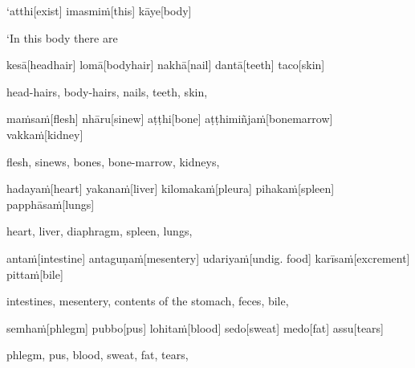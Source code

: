 \begin{samepage}
\begingl[glneveryline={\PaliGlossA,\PaliGlossB}]
‘atthi[exist] imasmiṁ[this] kāye[body]
\endgl
\nopagebreak
\linespread{0.5}
\begin{spacin}{0.2}
{\PaliGlossFT ‘In this body there are}
\end{spacin}
\vskip 12pt
\end{samepage}
\begin{samepage}
\begingl[glneveryline={\PaliGlossA,\PaliGlossB}]
kesā[headhair] lomā[bodyhair] nakhā[nail] dantā[teeth] taco[skin]
\endgl
\nopagebreak
\linespread{0.5}
\begin{spacin}{0.2}
{\PaliGlossFT head-hairs, body-hairs, nails, teeth, skin,}
\end{spacin}
\vskip 12pt
\end{samepage}
\begin{samepage}
\begingl[glneveryline={\PaliGlossA,\PaliGlossB}]
maṁsaṁ[flesh] nhāru[sinew] aṭṭhi[bone] aṭṭhimiñjaṁ[bonemarrow] vakkaṁ[kidney]
\endgl
\nopagebreak
\linespread{0.5}
\begin{spacin}{0.2}
{\PaliGlossFT flesh, sinews, bones, bone-marrow, kidneys,}
\end{spacin}
\vskip 12pt
\end{samepage}
\begin{samepage}
\begingl[glneveryline={\PaliGlossA,\PaliGlossB}]
hadayaṁ[heart] yakanaṁ[liver] kilomakaṁ[pleura] pihakaṁ[spleen] papphāsaṁ[lungs]
\endgl
\nopagebreak
\linespread{0.5}
\begin{spacin}{0.2}
{\PaliGlossFT heart, liver, diaphragm, spleen, lungs,}
\end{spacin}
\vskip 12pt
\end{samepage}
\begin{samepage}
\begingl[glneveryline={\PaliGlossA,\PaliGlossB}]
antaṁ[intestine] antaguṇaṁ[mesentery] udariyaṁ[undig. food] karīsaṁ[excrement] pittaṁ[bile]
\endgl
\nopagebreak
\linespread{0.5}
\begin{spacin}{0.2}
{\PaliGlossFT intestines, mesentery, contents of the stomach, feces, bile,}
\end{spacin}
\vskip 12pt
\end{samepage}
\begin{samepage}
\begingl[glneveryline={\PaliGlossA,\PaliGlossB}]
semhaṁ[phlegm] pubbo[pus] lohitaṁ[blood] sedo[sweat] medo[fat] assu[tears]
\endgl
\nopagebreak
\linespread{0.5}
\begin{spacin}{0.2}
{\PaliGlossFT phlegm, pus, blood, sweat, fat, tears,}
\end{spacin}
\vskip 12pt
\end{samepage}
